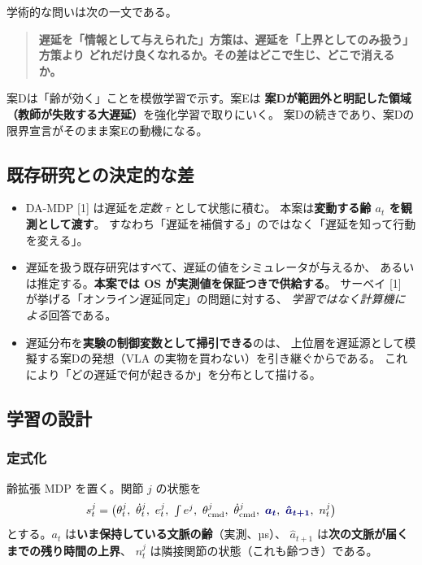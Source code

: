 \documentclass[11pt,a4paper]{article}
\newcommand{\keyp}[1]{\textbf{\textcolor{blue!45!black}{#1}}}
\begin{document}
\noindent
学術的な問いは次の一文である。

\begin{quote}
\keyp{遅延を「情報として与えられた」方策は、遅延を「上界としてのみ扱う」方策より
どれだけ良くなれるか。その差はどこで生じ、どこで消えるか。}
\end{quote}

\noindent
案Dは「齢が効く」ことを模倣学習で示す。案Eは
\keyp{案Dが範囲外と明記した領域（教師が失敗する大遅延）}を強化学習で取りにいく。
案Dの続きであり、案Dの限界宣言がそのまま案Eの動機になる。

\subsection{既存研究との決定的な差}

\begin{itemize}[leftmargin=1.4em,itemsep=3pt]
  \item DA-MDP [1] は遅延を\emph{定数} $\tau$ として状態に積む。
        本案は\keyp{変動する齢 $a_t$ を観測として渡す}。
        すなわち「遅延を補償する」のではなく「遅延を知って行動を変える」。
  \item 遅延を扱う既存研究はすべて、遅延の値をシミュレータが与えるか、
        あるいは推定する。\keyp{本案では OS が実測値を保証つきで供給する}。
        サーベイ [1] が挙げる「オンライン遅延同定」の問題に対する、
        \emph{学習ではなく計算機による}回答である。
  \item 遅延分布を\keyp{実験の制御変数として掃引できる}のは、
        上位層を遅延源として模擬する案Dの発想（VLA の実物を買わない）を引き継ぐからである。
        これにより「どの遅延で何が起きるか」を分布として描ける。
\end{itemize}

\subsection{学習の設計}

\subsubsection*{定式化}

齢拡張 MDP を置く。関節 $j$ の状態を
\[
  s^j_t=\bigl(\theta^j_t,\ \dot\theta^j_t,\ e^j_t,\ \textstyle\int e^j,\
  \theta^{j}_{\mathrm{cmd}},\ \dot\theta^{j}_{\mathrm{cmd}},\
  \textcolor{blue!45!black}{\boldsymbol{a_t}},\
  \textcolor{blue!45!black}{\boldsymbol{\hat a_{t+1}}},\ n^j_t \bigr)
\]
とする。$a_t$ は\keyp{いま保持している文脈の齢}（実測、µs）、
$\hat a_{t+1}$ は\keyp{次の文脈が届くまでの残り時間の上界}、
$n^j_t$ は隣接関節の状態（これも齢つき）である。
\end{document}
